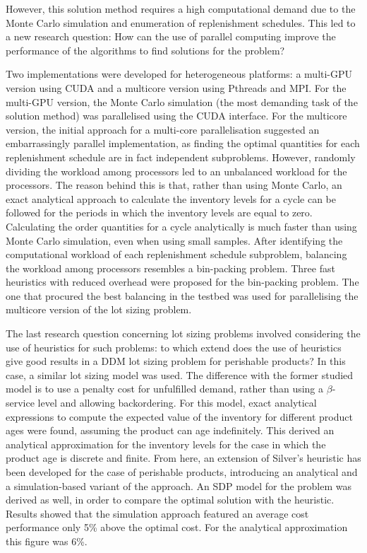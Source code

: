 However, this solution method requires a high computational demand due to the Monte Carlo simulation and enumeration of replenishment schedules. This led to a new research question: How can the use of parallel computing improve the performance of the algorithms to find solutions for the problem? 

Two implementations were developed for heterogeneous platforms: a multi-GPU version using CUDA and a multicore version using Pthreads and MPI. For the multi-GPU version, the Monte Carlo simulation (the most demanding task of the solution method) was parallelised using the CUDA interface. For the multicore version, the initial approach for a multi-core parallelisation suggested an embarrassingly parallel implementation, as finding the optimal quantities for each replenishment schedule are in fact independent subproblems. However, randomly dividing the workload among processors led to an unbalanced workload for the processors. The reason behind this is that, rather than using Monte Carlo, an exact analytical approach to calculate the inventory levels for a cycle can be followed for the periods in which the inventory levels are equal to zero. Calculating the order quantities for a cycle analytically is much faster than using Monte Carlo simulation, even when using small samples. After identifying the computational workload of each replenishment schedule subproblem, balancing the workload among processors resembles a bin-packing problem. Three fast heuristics with reduced overhead were proposed for the bin-packing problem. The one that procured the best balancing in the testbed was used for parallelising the multicore version of the lot sizing problem.

The last research question concerning lot sizing problems involved considering the use of heuristics for such problems: to which extend does the use of heuristics give good results in a DDM lot sizing problem for perishable products? In this case, a similar lot sizing model was used. The difference with the former studied model is to use a penalty cost for unfulfilled demand, rather than using a $\beta$-service level and allowing backordering. For this model, exact analytical expressions to compute the expected value of the inventory for different product ages were found, assuming the product can age indefinitely. This derived an analytical approximation for the inventory levels for the case in which the product age is discrete and finite. From here, an extension of Silver's heuristic has been developed for the case of perishable products, introducing an analytical and a simulation-based variant of the approach. An SDP model for the problem was derived as well, in order to compare the optimal solution with the heuristic. Results showed that the simulation approach featured an average cost performance only 5\% above the optimal cost. For the analytical approximation this figure was 6\%.


